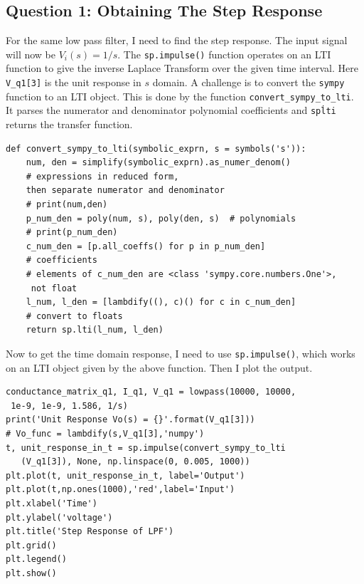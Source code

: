 \documentclass[11pt, a4paper]{article}
\begin{document}
\subsection{Question 1: Obtaining The Step Response}
For the same low pass filter, I need to find the step response. The input signal will now be $V_i(s)=1/s$. The \texttt{sp.impulse()} function operates on an LTI function to give the inverse Laplace Transform over the given time interval. Here \texttt{V\_q1[3]} is the unit response in $s$ domain. A challenge is to convert the \texttt{sympy} function to an LTI object. This is done by the function \texttt{convert\_sympy\_to\_lti}. It parses the numerator and denominator polynomial coefficients and \texttt{sp\.lti} returns the transfer function.  
\begin{verbatim}
def convert_sympy_to_lti(symbolic_exprn, s = symbols('s')):
    num, den = simplify(symbolic_exprn).as_numer_denom()
    # expressions in reduced form, 
    then separate numerator and denominator
    # print(num,den)
    p_num_den = poly(num, s), poly(den, s)  # polynomials
    # print(p_num_den)
    c_num_den = [p.all_coeffs() for p in p_num_den]  
    # coefficients
    # elements of c_num_den are <class 'sympy.core.numbers.One'>,
     not float
    l_num, l_den = [lambdify((), c)() for c in c_num_den]  
    # convert to floats
    return sp.lti(l_num, l_den)
\end{verbatim} 
Now to get the time domain response, I need to use \texttt{sp.impulse()}, which works on an LTI object given by the above function. Then I plot the output. 
\begin{verbatim}
conductance_matrix_q1, I_q1, V_q1 = lowpass(10000, 10000,
 1e-9, 1e-9, 1.586, 1/s)
print('Unit Response Vo(s) = {}'.format(V_q1[3]))
# Vo_func = lambdify(s,V_q1[3],'numpy')
t, unit_response_in_t = sp.impulse(convert_sympy_to_lti
   (V_q1[3]), None, np.linspace(0, 0.005, 1000))
plt.plot(t, unit_response_in_t, label='Output')
plt.plot(t,np.ones(1000),'red',label='Input')
plt.xlabel('Time')
plt.ylabel('voltage')
plt.title('Step Response of LPF')
plt.grid()
plt.legend()
plt.show()
\end{verbatim}    
\end{document}
